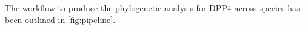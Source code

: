 The workflow to produce the phylogenetic analysis for DPP4 across species has been outlined in \ref{fig:pipeline}.